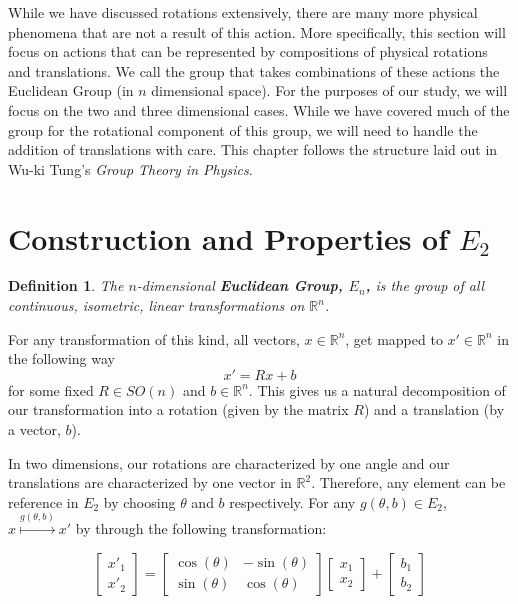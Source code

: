 \documentclass[10pt]{ucthesis}
\newcommand{\R}{\mathbb{R}}
\newtheorem{definition}{Definition}[chapter]
\begin{document}
While we have discussed rotations extensively, there are many more physical phenomena that are not a result of this action. More specifically, this section will focus on actions that can be represented by compositions of physical rotations and translations. We call the group that takes combinations of these actions the Euclidean Group (in $n$ dimensional space). For the purposes of our study, we will focus on the two and three dimensional cases. While we have covered much of the group for the rotational component of this group, we will need to handle the addition of translations with care. This chapter follows the structure laid out in Wu-ki Tung's \textit{Group Theory in Physics}. \cite{Tung}

\section{Construction and Properties of $E_2$}

\begin{definition}
	The $n$-dimensional \textbf{Euclidean Group, $E_n$,} is the group of all continuous, isometric, linear transformations on $\R^n$.
\end{definition}

For any transformation of this kind, all vectors, $x\in\R^n$, get mapped to $x'\in\R^n$ in the following way 
$$x' = Rx + b$$
for some fixed $R\in SO(n)$ and $b\in\R^n$. This gives us a natural decomposition of our transformation into a rotation (given by the matrix $R$) and a translation (by a vector, $b$).

In two dimensions, our rotations are characterized by one angle and our translations are characterized by one vector in $\R^2$. Therefore, any element can be reference in $E_2$ by choosing $\theta$ and $b$ respectively. For any $g(\theta,b)\in E_2$, $x\overset{g(\theta,b)}{\mapsto}x'$ by through the following transformation:

$$\begin{bmatrix}x'_1\\x'_2\end{bmatrix} = \begin{bmatrix}
			\cos(\theta) & -\sin(\theta) \\
			\sin(\theta) & \cos(\theta) 
		\end{bmatrix} \begin{bmatrix}x_1\\x_2\end{bmatrix} + \begin{bmatrix}b_1\\b_2\end{bmatrix} $$
\end{document}
